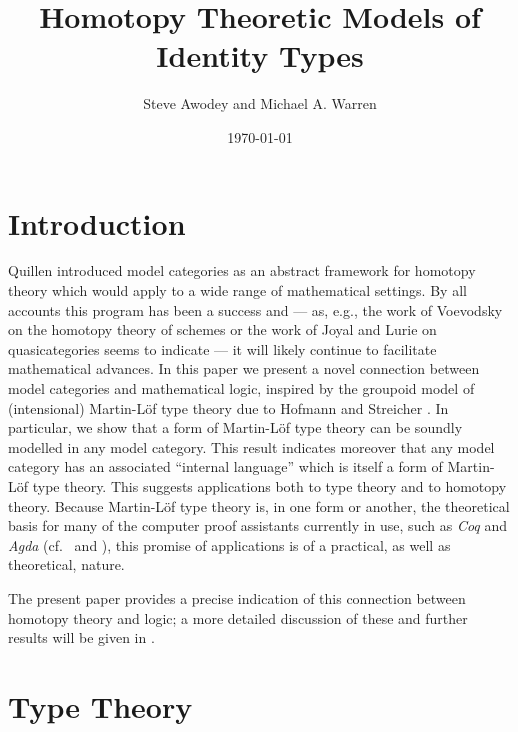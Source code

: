 \documentclass[12pt]{amsart}
\theoremstyle{definition}
\theoremstyle{remark}
\begin{document}
\author{Steve Awodey and Michael A. Warren}
\date{\today}
\address{Department of Philosophy\\Carnegie Mellon
  University\\Pittsburgh, PA\\USA 15213}

\title[identity types]{Homotopy Theoretic Models of Identity Types}
\maketitle
\section{Introduction}

\noindent Quillen \cite{Quillen:HA} introduced model categories as an
abstract framework for homotopy theory which would apply to a wide
range of mathematical settings.  By all accounts this program has been
a success and ---  as, e.g., the work of Voevodsky on the homotopy theory of
schemes \cite{Morel:A1HTS} or the work of Joyal
\cite{Joyal:QCKC,Joyal:NOQC} and Lurie \cite{Lurie:HTT} on
quasicategories seems to indicate --- it will likely continue to
facilitate mathematical advances.  In this paper we present a
novel connection between model categories and mathematical logic, inspired by
the groupoid model of (intensional) Martin-L\"{o}f type theory
\cite{MartinLof:ITT} due to Hofmann and Streicher \cite{Hofmann:GITT}.  In
particular, we show that a form of Martin-L\"{o}f type
theory can be soundly modelled in any model
category.  This result indicates moreover that any model category
has an associated ``internal language'' which is itself a form of
Martin-L\"{o}f type theory.  This suggests applications both to
type theory and to homotopy theory.  Because Martin-L\"{o}f type
theory is, in one form or another, the theoretical basis for many of
the computer proof assistants currently in use, such as \emph{Coq} and
\emph{Agda} (cf.~\cite{Bertot:ITPPD} and \cite{Coquand:STT}),
this promise of applications is of a practical, as well as theoretical, nature.

The present paper provides a precise indication of this connection
between homotopy theory and logic; a more detailed discussion
of these and further results will be given in \cite{Warren:PhD}.

\section{Type Theory}\label{section:type_theory}
\end{document}
